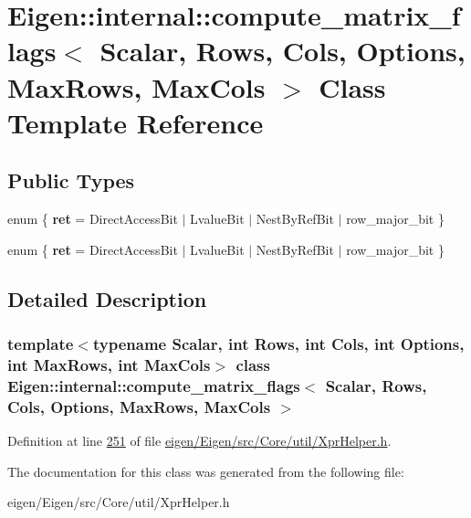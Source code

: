 \hypertarget{class_eigen_1_1internal_1_1compute__matrix__flags}{}\section{Eigen\+:\+:internal\+:\+:compute\+\_\+matrix\+\_\+flags$<$ Scalar, Rows, Cols, Options, Max\+Rows, Max\+Cols $>$ Class Template Reference}
\label{class_eigen_1_1internal_1_1compute__matrix__flags}
\subsection*{Public Types}
\begin{DoxyCompactItemize}
\item 
\mbox{\label{class_eigen_1_1internal_1_1compute__matrix__flags_a77be2226314afc635979eb3c1291ace5}} 
enum \{ {\bfseries ret} = Direct\+Access\+Bit $\vert$ Lvalue\+Bit $\vert$ Nest\+By\+Ref\+Bit $\vert$ row\+\_\+major\+\_\+bit
 \}
\item 
\mbox{\label{class_eigen_1_1internal_1_1compute__matrix__flags_a9120ee3000c426d80fbcc241670ce8e5}} 
enum \{ {\bfseries ret} = Direct\+Access\+Bit $\vert$ Lvalue\+Bit $\vert$ Nest\+By\+Ref\+Bit $\vert$ row\+\_\+major\+\_\+bit
 \}
\end{DoxyCompactItemize}


\subsection{Detailed Description}
\subsubsection*{template$<$typename Scalar, int Rows, int Cols, int Options, int Max\+Rows, int Max\+Cols$>$\newline
class Eigen\+::internal\+::compute\+\_\+matrix\+\_\+flags$<$ Scalar, Rows, Cols, Options, Max\+Rows, Max\+Cols $>$}



Definition at line \hyperlink{eigen_2_eigen_2src_2_core_2util_2_xpr_helper_8h_source_l00251}{251} of file \hyperlink{eigen_2_eigen_2src_2_core_2util_2_xpr_helper_8h_source}{eigen/\+Eigen/src/\+Core/util/\+Xpr\+Helper.\+h}.



The documentation for this class was generated from the following file\+:\begin{DoxyCompactItemize}
\item 
eigen/\+Eigen/src/\+Core/util/\+Xpr\+Helper.\+h\end{DoxyCompactItemize}
